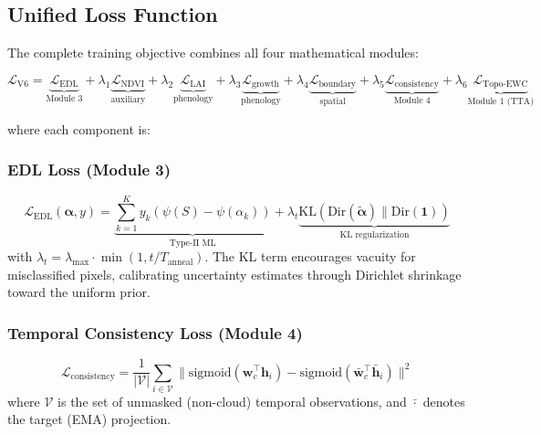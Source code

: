 \subsection{Unified Loss Function}

The complete training objective combines all four mathematical modules:

\begin{equation}\label{eq:unified-loss}
    \mathcal{L}_{\text{V6}} = \underbrace{\mathcal{L}_{\text{EDL}}}_{\text{Module 3}} +
    \lambda_1 \underbrace{\mathcal{L}_{\text{NDVI}}}_{\text{auxiliary}} +
    \lambda_2 \underbrace{\mathcal{L}_{\text{LAI}}}_{\text{phenology}} +
    \lambda_3 \underbrace{\mathcal{L}_{\text{growth}}}_{\text{phenology}} +
    \lambda_4 \underbrace{\mathcal{L}_{\text{boundary}}}_{\text{spatial}} +
    \lambda_5 \underbrace{\mathcal{L}_{\text{consistency}}}_{\text{Module 4}} +
    \lambda_6 \underbrace{\mathcal{L}_{\text{Topo-EWC}}}_{\text{Module 1 (TTA)}}
\end{equation}

where each component is:

\subsubsection{EDL Loss (Module 3)}

\begin{equation}
    \mathcal{L}_{\text{EDL}}(\boldsymbol{\alpha}, y) =
    \underbrace{\sum_{k=1}^K y_k(\psi(S) - \psi(\alpha_k))}_{\text{Type-II ML}} +
    \lambda_t \underbrace{\text{KL}(\text{Dir}(\tilde{\boldsymbol{\alpha}}) \|
    \text{Dir}(\mathbf{1}))}_{\text{KL regularization}}
\end{equation}
with $\lambda_t = \lambda_{\max} \cdot \min(1, t / T_{\text{anneal}})$.
The KL term encourages vacuity for misclassified pixels, calibrating
uncertainty estimates through Dirichlet shrinkage toward the uniform prior.

\subsubsection{Temporal Consistency Loss (Module 4)}

\begin{equation}
    \mathcal{L}_{\text{consistency}} = \frac{1}{|\mathcal{V}|}\sum_{i \in \mathcal{V}}
    \|\text{sigmoid}(\mathbf{w}_c^\top \mathbf{h}_i) -
      \text{sigmoid}(\bar{\mathbf{w}}_c^\top \bar{\mathbf{h}}_i)\|^2
\end{equation}
where $\mathcal{V}$ is the set of unmasked (non-cloud) temporal observations,
and $\bar{\cdot}$ denotes the target (EMA) projection.

